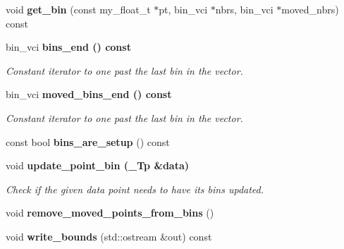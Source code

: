 \begin{CompactItemize}
\item 
void \textbf{get\_\-bin} (const my\_\-float\_\-t $\ast$pt, bin\_\-vci $\ast$nbrs, bin\_\-vci $\ast$moved\_\-nbrs) const \label{classASCbase_1_1point__bins_3efe4ebd6c36993e1be9802c8edf1c35}

\item 
bin\_\-vci \bf{bins\_\-end} () const \label{classASCbase_1_1point__bins_f9c9f7b5c7be74b76b0eba306879324d}

\begin{CompactList}\small\item\em Constant iterator to one past the last bin in the vector. \item\end{CompactList}\item 
bin\_\-vci \bf{moved\_\-bins\_\-end} () const \label{classASCbase_1_1point__bins_54a580e492ce7205e0bc5fc58f4bf26a}

\begin{CompactList}\small\item\em Constant iterator to one past the last bin in the vector. \item\end{CompactList}\item 
const bool \textbf{bins\_\-are\_\-setup} () const \label{classASCbase_1_1point__bins_c748633d67a3d339c7a895b43666aec1}

\item 
void \bf{update\_\-point\_\-bin} (\_\-Tp \&data)\label{classASCbase_1_1point__bins_e07134e8f4497da13dd6136bcb45602e}

\begin{CompactList}\small\item\em Check if the given data point needs to have its bins updated. \item\end{CompactList}\item 
void \textbf{remove\_\-moved\_\-points\_\-from\_\-bins} ()\label{classASCbase_1_1point__bins_5729496a671be351b0826b5452770e06}

\item 
void \textbf{write\_\-bounds} (std::ostream \&out) const \label{classASCbase_1_1point__bins_701b0831628d6b9e7e2b878da1488bd6}

\end{CompactItemize}
